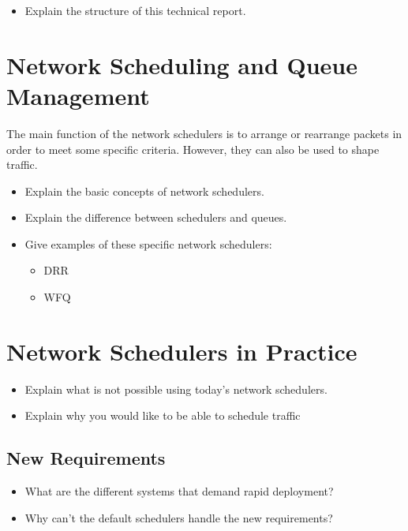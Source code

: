 \documentclass[sigconf, nonacm]{acmart}
\begin{document}
\begin{itemize}
\item Explain the structure of this technical report.
\end{itemize}

\section{Network Scheduling and Queue Management}

The main function of the network schedulers is to arrange or rearrange packets
in order to meet some specific criteria. However, they can also be used to shape
traffic.

\begin{itemize}
\item Explain the basic concepts of network schedulers.
\item Explain the difference between schedulers and queues.
  \item Give examples of these specific network schedulers:
        \begin{itemize}
          \item DRR
          \item WFQ
        \end{itemize}
\end{itemize}


\section{Network Schedulers in Practice}

\begin{itemize}
  \item Explain what is not possible using today's network schedulers.
  \item Explain why you would like to be able to schedule traffic
\end{itemize}

\subsection{New Requirements}

\begin{itemize}
  \item What are the different systems that demand rapid deployment?
  \item Why can't the default schedulers handle the new requirements?
\end{itemize}
\end{document}
